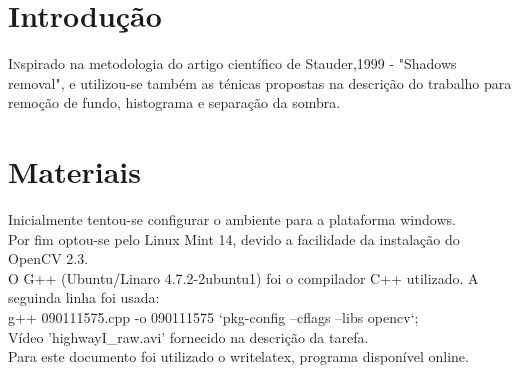 \documentclass[twoside]{article}
\begin{document}
\begin{multicols}{2} %

\section{Introdução}

\lettrine[nindent=0em,lines=2]{I} nspirado na metodologia do artigo científico de Stauder,1999 - "Shadows removal", e utilizou-se também as ténicas propostas na descrição do trabalho para remoção de fundo, histograma e separação da sombra.


\section{Materiais}

 
Inicialmente tentou-se configurar o ambiente para a plataforma windows.\\
Por fim optou-se pelo Linux Mint 14, devido a facilidade da instalação do OpenCV 2.3. \\
O G++ (Ubuntu/Linaro 4.7.2-2ubuntu1) foi o compilador C++ utilizado. A seguinda linha foi usada:\\
g++ 090111575.cpp -o 090111575 `pkg-config --cflags --libs opencv`;
\\Vídeo 'highwayI\_raw.avi' fornecido na descrição da tarefa.
\\Para este documento foi utilizado o writelatex, programa disponível online.



\end{multicols}
\end{document}
